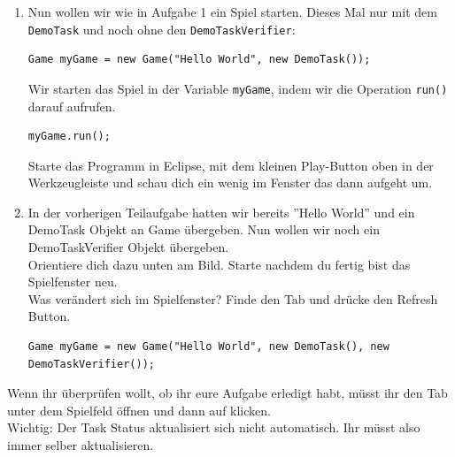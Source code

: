 

\begin{enumerate}
    \item Nun wollen wir wie in Aufgabe 1 ein Spiel starten. 
        Dieses Mal nur mit dem \lstinline{DemoTask} und noch ohne den \lstinline{DemoTaskVerifier}:

    \vspace{3mm}

    \begin{lstlisting}
Game myGame = new Game("Hello World", new DemoTask());
    \end{lstlisting}

    \vspace{3mm}

    Wir starten das Spiel in der Variable \lstinline{myGame}, indem wir die Operation \lstinline{run()} darauf aufrufen.

    \vspace{3mm}

    \begin{lstlisting}
myGame.run();
    \end{lstlisting}

    Starte das Programm in Eclipse, mit dem kleinen Play-Button oben in der Werkzeugleiste und schau dich ein wenig im Fenster das dann aufgeht um.

    \vspace{5mm}

    \item In der vorherigen Teilaufgabe hatten wir bereits ''Hello World'' und ein DemoTask Objekt an Game übergeben.
        Nun wollen wir noch ein DemoTaskVerifier Objekt übergeben.\\
        Orientiere dich dazu unten am Bild. Starte nachdem du fertig bist das Spielfenster neu. \\

        Was verändert sich im Spielfenster? 
        Finde den  Tab und drücke den Refresh Button.

    \begin{lstlisting}
Game myGame = new Game("Hello World", new DemoTask(), new DemoTaskVerifier());
    \end{lstlisting}

\end{enumerate}


\begin{Infobox}
    Wenn ihr überprüfen wollt, ob ihr eure Aufgabe erledigt habt, müsst ihr den  Tab unter dem Spielfeld öffnen und dann auf  klicken.\\

    Wichtig: Der Task Status aktualisiert sich nicht automatisch. Ihr müsst also immer selber aktualisieren.
\end{Infobox}


